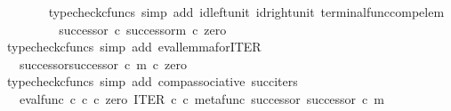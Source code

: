 \begin{isabellebody}
\ \ \ \ \ \ \isamarkupfalse%
\ {\isacharparenleft}{\kern0pt}typecheck{\isacharunderscore}{\kern0pt}cfuncs{\isacharcomma}{\kern0pt}\ simp\ add{\isacharcolon}{\kern0pt}\ id{\isacharunderscore}{\kern0pt}left{\isacharunderscore}{\kern0pt}unit{}\ id{\isacharunderscore}{\kern0pt}right{\isacharunderscore}{\kern0pt}unit{}\ terminal{\isacharunderscore}{\kern0pt}func{\isacharunderscore}{\kern0pt}comp{\isacharunderscore}{\kern0pt}elem{\isacharparenright}{\kern0pt}\isanewline
\ \ \ \ \isamarkupfalse%
\ \isamarkupfalse%
\ {\isachardoublequoteopen}{\isachardot}{\kern0pt}{\isachardot}{\kern0pt}{\isachardot}{\kern0pt}\ {\isacharequal}{\kern0pt}\ successor\ {\isasymcirc}\isactrlsub c\ {\isacharparenleft}{\kern0pt}successor\isactrlbsup {\isasymcirc}m\isactrlesup {\isacharparenright}{\kern0pt}\ {\isasymcirc}\isactrlsub c\ zero{\isachardoublequoteclose}\isanewline
\ \ \ \ \ \ \isamarkupfalse%
\ {\isacharparenleft}{\kern0pt}typecheck{\isacharunderscore}{\kern0pt}cfuncs{\isacharcomma}{\kern0pt}\ simp\ add{\isacharcolon}{\kern0pt}\ eval{\isacharunderscore}{\kern0pt}lemma{\isacharunderscore}{\kern0pt}for{\isacharunderscore}{\kern0pt}ITER{\isacharparenright}{\kern0pt}\isanewline
\ \ \ \ \isamarkupfalse%
\ \isamarkupfalse%
\ {\isachardoublequoteopen}{\isachardot}{\kern0pt}{\isachardot}{\kern0pt}{\isachardot}{\kern0pt}\ {\isacharequal}{\kern0pt}\ {\isacharparenleft}{\kern0pt}successor\isactrlbsup {\isasymcirc}successor\ {\isasymcirc}\isactrlsub c\ m\isactrlesup {\isacharparenright}{\kern0pt}\ {\isasymcirc}\isactrlsub c\ zero{\isachardoublequoteclose}\isanewline
\ \ \ \ \ \ \isamarkupfalse%
\ {\isacharparenleft}{\kern0pt}typecheck{\isacharunderscore}{\kern0pt}cfuncs{\isacharcomma}{\kern0pt}\ simp\ add{\isacharcolon}{\kern0pt}\ comp{\isacharunderscore}{\kern0pt}associative{}\ succ{\isacharunderscore}{\kern0pt}iters{\isacharparenright}{\kern0pt}\isanewline
\ \ \ \ \isamarkupfalse%
\ \isamarkupfalse%
\ {\isachardoublequoteopen}{\isachardot}{\kern0pt}{\isachardot}{\kern0pt}{\isachardot}{\kern0pt}\ {\isacharequal}{\kern0pt}\ eval{\isacharunderscore}{\kern0pt}func\ {\isasymnat}\isactrlsub c\ {\isasymnat}\isactrlsub c\ {\isasymcirc}\isactrlsub c\ {\isasymlangle}zero\ {\isacharcomma}{\kern0pt}ITER\ {\isasymnat}\isactrlsub c\ {\isasymcirc}\isactrlsub c\ {\isasymlangle}metafunc\ successor\ {\isacharcomma}{\kern0pt}successor\ {\isasymcirc}\isactrlsub c\ m{\isasymrangle}{\isasymrangle}{\isachardoublequoteclose}\isanewline

\end{isabellebody}
